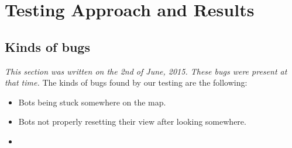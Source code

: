 \chapter{Testing Approach and Results}
\section{Kinds of bugs}
\emph{This section was written on the 2nd of June, 2015. These bugs were present at that time.}
\newline\newline
The kinds of bugs found by our testing are the following:

\begin{itemize}
\item Bots being stuck somewhere on the map.
\item Bots not properly resetting their view after looking somewhere.
\item 
\end{itemize}